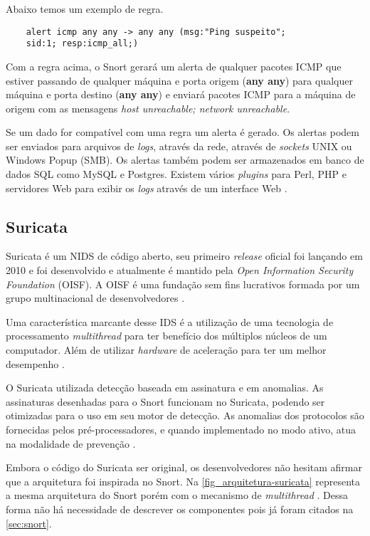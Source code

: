 Abaixo temos um exemplo de regra.

\begin{lstlisting}
    alert icmp any any -> any any (msg:"Ping suspeito"; 
    sid:1; resp:icmp_all;)
\end{lstlisting}

Com a regra acima, o Snort gerará um alerta de qualquer pacotes ICMP que estiver passando de qualquer máquina e porta origem (\textbf{any any}) para qualquer máquina e porta destino (\textbf{any any}) e enviará pacotes ICMP para a máquina de origem com as mensagens \textit{host unreachable; network unreachable}.

Se um dado for compatível com uma regra um alerta é gerado. Os alertas podem ser enviados para arquivos de \textit{logs}, através da rede, através de \textit{sockets} UNIX ou Windows Popup (SMB). Os alertas também podem ser armazenados em banco de dados SQL como MySQL e Postgres. Existem vários \textit{plugins} para Perl, PHP e servidores Web para exibir os \textit{logs} através de um interface Web \cite{snort:andrew}.

\subsection{Suricata} \label{sec:suricata}

Suricata é um NIDS de código aberto, seu primeiro \textit{release} oficial foi lançando em 2010 e foi desenvolvido e atualmente é mantido pela \textit{Open Information Security Foundation} (OISF). A OISF é uma fundação sem fins lucrativos formada por um grupo multinacional de desenvolvedores \cite{suricata}.

Uma característica marcante desse IDS é a utilização de uma tecnologia de processamento \textit{multithread} para ter benefício dos múltiplos núcleos de um computador. Além de utilizar \textit{hardware} de aceleração para ter um melhor desempenho \cite{arquitetura:martin}.

O Suricata utilizada detecção baseada em assinatura e em anomalias. As assinaturas desenhadas para o Snort funcionam no Suricata, podendo ser otimizadas para o uso em seu motor de detecção. As anomalias dos protocolos são fornecidas pelos pré-processadores, e quando implementado no modo ativo, atua na modalidade de prevenção \cite{arquitetura:martin}.

Embora o código do Suricata ser original, os desenvolvedores não hesitam afirmar que a arquitetura foi inspirada no Snort. Na \autoref{fig_arquitetura-suricata} representa a mesma arquitetura do Snort porém com o mecanismo de \textit{multithread} \cite{arquitetura:martin}. Dessa forma não há necessidade de descrever os componentes pois já foram citados na \autoref{sec:snort}.

